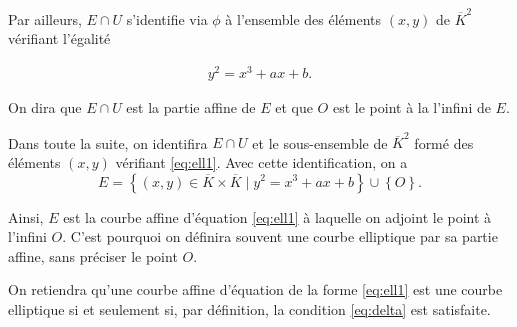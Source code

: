 Par ailleurs, $E \cap U$ s'identifie via $\phi$ à l'ensemble des éléments $(x,y)$ de $\overline{K}^2$ vérifiant l'égalité

\begin{align}
    \label{eq:ell1}
y^2 = x^3 + ax + b
.\end{align}

On dira que $E \cap U$ est la partie affine de $E$ et que $O$ est le point à la l'infini de $E$.

Dans toute la suite, on identifira $E \cap U$ et le sous-ensemble de $\overline{K}^2$ formé des éléments $(x,y)$ vérifiant \eqref{eq:ell1}. Avec cette identification, on a 
\[
E = \left\{ (x,y) \in \overline{K} \times \overline{K} \mid y^2=x^3+ax+b \right\} \cup \left\{ O \right\} 
.\] 

Ainsi, $E$ est la courbe affine d'équation \eqref{eq:ell1} à laquelle on adjoint le point à l'infini $O$. C'est pourquoi on définira souvent une courbe elliptique par sa partie affine, sans préciser le point $O$.

\begin{remarque}
    On retiendra qu'une courbe affine d'équation de la forme \eqref{eq:ell1} est une courbe
    elliptique si et seulement si, par définition, la condition \eqref{eq:delta} est satisfaite.
\end{remarque}










